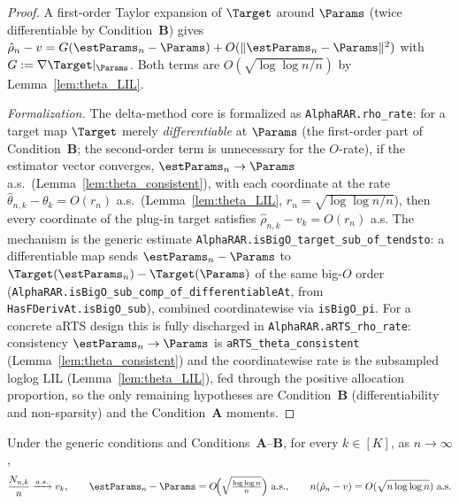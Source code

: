 \begin{proof}\leanok
{}
A first-order Taylor expansion of $\Target$ around $\Params$ (twice
differentiable by Condition~\textbf{B}) gives
$\hat{\rho}_n - v = G(\estParams_n-\Params) + O(\|\estParams_n-\Params\|^2)$
with $G := \nabla\Target|_\Params$. Both terms are
$O(\sqrt{\log\log n / n})$ by Lemma~\ref{lem:theta_LIL}.

\emph{Formalization.} The delta-method core is formalized as \texttt{AlphaRAR.rho\_rate}: for a target
map $\Target$ merely \emph{differentiable} at $\Params$ (the first-order part of Condition~\textbf{B};
the second-order term is unnecessary for the $O$-rate), if the estimator vector converges,
$\estParams_n\to\Params$ a.s.\ (Lemma~\ref{lem:theta_consistent}), with each coordinate at the rate
$\hat\theta_{n,k}-\theta_k = O(r_n)$ a.s.\ (Lemma~\ref{lem:theta_LIL}, $r_n=\sqrt{\log\log n/n}$),
then every coordinate of the plug-in target satisfies $\hat\rho_{n,k}-v_k = O(r_n)$ a.s. The
mechanism is the generic estimate \texttt{AlphaRAR.isBigO\_target\_sub\_of\_tendsto}: a differentiable
map sends $\estParams_n-\Params$ to $\Target(\estParams_n)-\Target(\Params)$ of the same big-$O$ order
(\texttt{AlphaRAR.isBigO\_sub\_comp\_of\_differentiableAt}, from \texttt{HasFDerivAt.isBigO\_sub}),
combined coordinatewise via \texttt{isBigO\_pi}. For a concrete aRTS design this is fully discharged in
\texttt{AlphaRAR.aRTS\_rho\_rate}: consistency $\estParams_n\to\Params$ is
\texttt{aRTS\_theta\_consistent} (Lemma~\ref{lem:theta_consistent}) and the coordinatewise rate is the
subsampled loglog LIL (Lemma~\ref{lem:theta_LIL}), fed through the positive allocation proportion, so
the only remaining hypotheses are Condition~\textbf{B} (differentiability and non-sparsity) and the
Condition~\textbf{A} moments.
\end{proof}

\begin{theorem}\label{thm:LLN}
\leanok
{}
Under the generic conditions and Conditions~\textbf{A}--\textbf{B}, for every
$k\in[K]$, as $n\to\infty$,
\[
  \frac{N_{n,k}}{n}\xrightarrow{a.s.} v_k, \qquad
  \estParams_n - \Params = O\!\Big(\sqrt{\tfrac{\log\log n}{n}}\Big)\ \text{a.s.},\qquad
  n(\hat{\rho}_n - v) = O(\sqrt{n\log\log n})\ \text{a.s.}
\]
\end{theorem}

